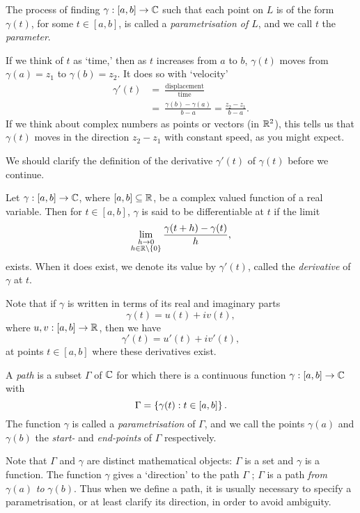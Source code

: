 The process of finding $\gamma : [a,b] \to \mathbb{C}$ such that each point on $L$ is of the form $\gamma (t)$, for some $t \in [a,b]$, is called a \emph{parametrisation of $L$}, and we call $t$ the \emph{parameter}.

If we think of $t$ as `time,' then as $t$ increases from $a$ to $b$, $\gamma (t)$ moves from $\gamma (a) = z_1$ to $\gamma (b) = z_2$.  It does so with `velocity'
\begin{align*}
\gamma'(t) &=\ \frac{\text{displacement}}{\text{time}} \\[2ex]
& =\  \frac{\gamma (b) - \gamma (a)}{b-a} = \frac{z_2  - z_1}{b-a}.
\end{align*}
If we think about complex numbers as points or vectors (in $\mathbb{R}^2$), this tells us that $\gamma (t)$ moves in the direction $z_2-z_1$ with constant speed, as you might expect.

We should clarify the definition of the derivative $\gamma'(t)$ of $\gamma(t)$ before we continue.
\begin{definition}
Let $\gamma:[a,b] \to \mathbb{C}$, where $[a,b] \subseteq \mathbb{R}$, be a complex valued function of a real variable.  Then for $t \in [a,b]$, $\gamma$ is said to be differentiable at $t$ if the limit
\[
\displaystyle \lim_{\substack{h \to 0 \\ h \in \mathbb{R} \backslash \left\{0\right\}}} \frac{\gamma (t+h)-\gamma(t)}{h},
\]
exists.  When it does exist, we denote its value by $\gamma'(t)$, called the \emph{derivative} of $\gamma$ at $t$.
\end{definition}
Note that if $\gamma$ is written in terms of its real and imaginary parts
\[
\gamma(t) = u(t) + i v(t),
\]
where $u,v:[a,b] \to \mathbb{R}$, then we have
\[
\gamma'(t) = u'(t) +i v'(t),
\]
at points $t \in [a,b]$ where these derivatives exist.

\begin{definition}
A \emph{path} is a subset $\Gamma$ of $\mathbb{C}$ for which there is a continuous function $\gamma : [a,b] \to \mathbb{C}$ with
\[
\Gamma = \left\{ \gamma (t) : t \in [a,b] \right\}.
\]
The function $\gamma$ is called a \emph{parametrisation} of $\Gamma$, and we call the points $\gamma(a)$ and $\gamma(b)$ the \emph{start-} and \emph{end-points} of $\Gamma$ respectively.
\end{definition}
Note that $\Gamma$ and $\gamma$ are distinct mathematical objects: $\Gamma$ is a set and $\gamma$ is a function.  The function $\gamma$ gives a `direction' to the path $\Gamma$ ; $\Gamma$ is a path \emph{from} $\gamma (a)$ \emph{to} $\gamma(b)$. Thus when we define a path, it is usually necessary to specify a parametrisation, or at least clarify its direction, in order to avoid ambiguity.


